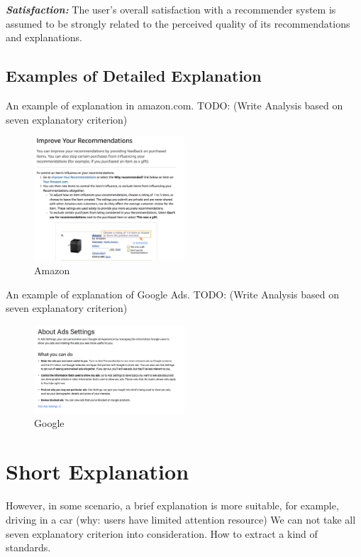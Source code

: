         \indent \textbf{\textit{Satisfaction:}} The user’s overall satisfaction with a recommender system is assumed to be 
        strongly related to the perceived quality of its recommendations and explanations\cite{swearingen2002interaction}.
 
    \subsection{Examples of Detailed Explanation}
        An example of explanation in amazon.com.
        TODO: (Write Analysis based on seven explanatory criterion) 
        \begin{figure}[H]
            \centering
            \includegraphics[width=0.5\textwidth]{img/amazon1}
            \caption{Amazon}
            \label{fig:amazon1}
        \end{figure}
        An example of explanation of Google Ads.
        TODO:  (Write Analysis based on seven explanatory criterion) 
        \begin{figure}[H]
            \centering
            \includegraphics[width=0.5\textwidth]{img/google1}
            \caption{Google}
            \label{fig:google1}
        \end{figure}
\section{Short Explanation}
    However, in some scenario, a brief explanation is more suitable, for example, driving in a car
    (why: users have limited attention resource)
    We can not take all seven explanatory criterion into consideration.
    How to extract a kind of standards.
    
